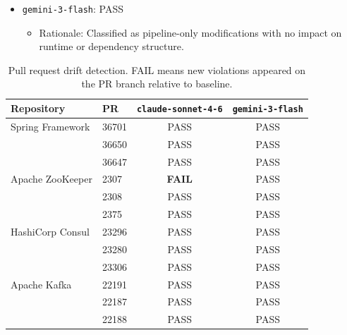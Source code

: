 \documentclass[sigconf,screen]{acmart}
\begin{document}
\begin{itemize}
\begin{itemize}
\begin{itemize}
            \begin{itemize}
                \item Rationale: Vulnerability scan script changes affect only CI tooling and not application logic or architecture.
            \end{itemize}
            \item \texttt{gemini-3-flash}: PASS
            \begin{itemize}
                \item Rationale: Classified as pipeline-only modifications with no impact on runtime or dependency structure.
            \end{itemize}
        \end{itemize}
    \end{itemize}
\end{itemize}


\begin{table}[t]
    \centering
    \small
    \caption{Pull request drift detection. FAIL means new violations appeared on the PR branch relative to baseline.}\label{tab:pr-drift}
    \begin{tabular}{p{}p{}cc}
        \toprule
        \textbf{Repository} & \textbf{PR} & \texttt{claude-sonnet-4-6} & \texttt{gemini-3-flash} \\
        \midrule
        Spring Framework & 36701 & PASS & PASS \\
                                        & 36650 & PASS & PASS \\
                                        & 36647 & PASS & PASS \\
        \midrule
        Apache ZooKeeper & 2307 & \textbf{FAIL} & PASS \\
                                        & 2308 & PASS & PASS \\
                                        & 2375 & PASS & PASS \\
        \midrule
        HashiCorp Consul & 23296 & PASS & PASS \\ 
                                        & 23280 & PASS & PASS \\ 
                                        & 23306 & PASS & PASS \\
        \midrule
        Apache Kafka & 22191 & PASS & PASS \\
                                        & 22187 & PASS & PASS \\
                                        & 22188 & PASS & PASS \\
        \bottomrule
    \end{tabular}
\end{table}
\end{document}
